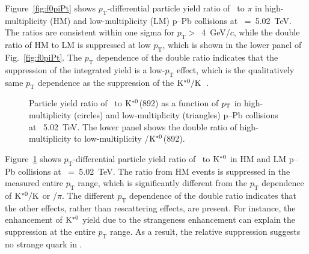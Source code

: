 Figure~\ref{fig:f0piPt} shows $p_{\mathrm{T}}$-differential particle yield ratio of \fzero~to $\pi$ in high-multiplicity (HM) and low-multiplicity (LM) p--Pb collisions at \snn~=~5.02~TeV. The ratios are consistent within one sigma for $p_{\mathrm{T}}>$~4~GeV/$c$, while the double ratio of HM to LM is suppressed at low $p_{\mathrm{T}}$, which is shown in the lower panel of Fig.~\ref{fig:f0piPt}. The $p_{\mathrm{T}}$ dependence of the double ratio indicates that the suppression of the integrated yield is a low-$p_{\mathrm{T}}$ effect, which is the qualitatively same $p_{\mathrm{T}}$ dependence as the suppression of the $\rm{}K^{*0}/K$~\cite{ALICE:2019etb}.

\begin{figure}[!hbt]
	\centering
	\caption{ Particle yield ratio of \fzero~to $\rm{}K^{*0}$(892) as a function of $p_{\rm{T}}$ in high-multiplicity (circles) and low-multiplicity (triangles) p--Pb collisions at \snn~5.02~TeV. The lower panel shows the double ratio of high-multiplicity to low-multiplicity \fzero/$\rm{}K^{*0}$(892).  }
	\label{fig:f0KsPt}
\end{figure}

Figure~\ref{fig:f0KsPt} shows $p_{\mathrm{T}}$-differential particle yield ratio of \fzero~to $\rm{}K^{*0}$ in HM and LM p--Pb collisions at \snn~=~5.02~TeV. The ratio from HM events is suppressed in the measured entire $p_{\mathrm{T}}$ range, which is significantly different from the $p_{\mathrm{T}}$ dependence of $\rm{}K^{*0}/K$ or \fzero/$\pi$. The different $p_{\mathrm{T}}$ dependence of the double ratio indicates that the other effects, rather than rescattering effects, are present. For instance, the enhancement of $\rm{}K^{*0}$ yield due to the strangeness enhancement can explain the suppression at the entire $p_{\mathrm{T}}$ range. As a result, the relative suppression suggests no strange quark in \fzero.

